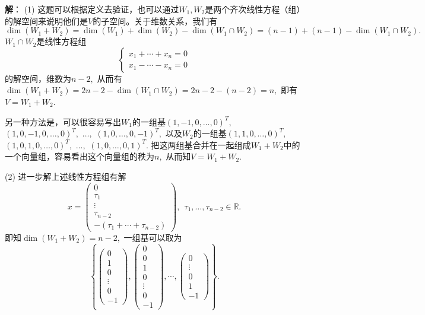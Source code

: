 \ifIncludeAnswer

\newpageorvspace

{\bf 解}： (1) 这题可以根据定义去验证，也可以通过$W_1, W_2$是两个齐次线性方程（组）的解空间来说明他们是$V$的子空间。关于维数关系，我们有
$$\dim (W_1 + W_2) = \dim(W_1) + \dim(W_2) - \dim(W_1 \cap W_2) = (n - 1) + (n - 1) - \dim(W_1 \cap W_2).$$
$W_1 \cap W_2$是线性方程组
$$
\begin{cases}
x_1 + \cdots + x_n = 0 \\
x_1 - \cdots - x_n = 0
\end{cases}
$$
的解空间，维数为$n-2,$ 从而有$\dim (W_1 + W_2) = 2n - 2 - \dim(W_1 \cap W_2) = 2n - 2 - (n - 2) = n,$ 即有$V = W_1 + W_2$.

另一种方法是，可以很容易写出$W_1$的一组基$(1, -1, 0, \ldots, 0)^T,$ $(1, 0, -1, 0, \ldots, 0)^T,$ $\ldots,$ $(1, 0, \ldots, 0, -1)^T,$ 以及$W_2$的一组基$(1, 1, 0, \ldots, 0)^T,$ $(1, 0, 1, 0, \ldots, 0)^T,$ $\ldots,$ $(1, 0, \ldots, 0, 1)^T.$ 把这两组基合并在一起组成$W_1 + W_2$中的一个向量组，容易看出这个向量组的秩为$n,$ 从而知$V = W_1 + W_2.$

(2) 进一步解上述线性方程组有解
$$x = \begin{pmatrix} 0 \\ \tau_1 \\ \vdots \\ \tau_{n-2} \\ -(\tau_1 + \cdots + \tau_{n-2}) \end{pmatrix}, ~~ \tau_1, \ldots, \tau_{n-2} \in \mathbb{R}.$$
即知$\dim (W_1 + W_2) = n - 2,$ 一组基可以取为
$$\left\{ \begin{pmatrix} 0 \\ 1 \\ 0 \\ \vdots \\ 0 \\ -1 \end{pmatrix}, \begin{pmatrix} 0 \\ 0 \\ 1 \\ 0 \\ \vdots \\ 0 \\ -1 \end{pmatrix}, \cdots, \begin{pmatrix} 0 \\ \vdots \\ 0 \\ 1 \\ -1 \end{pmatrix} \right\}.$$

